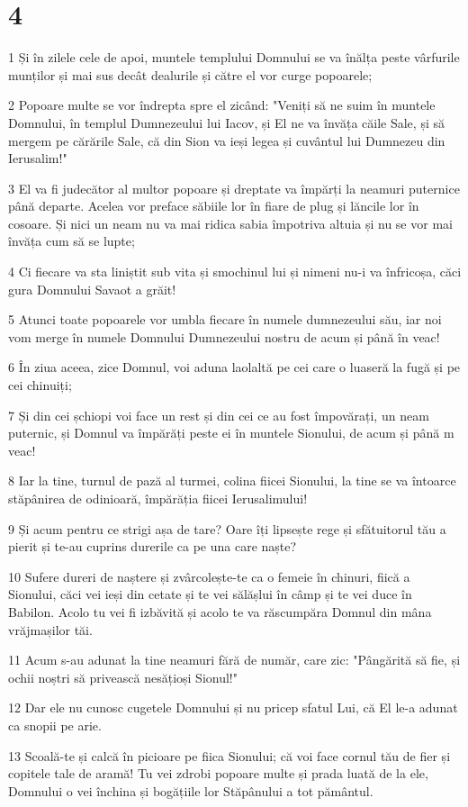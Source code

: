 \chapter{4}

\par 1 Și în zilele cele de apoi, muntele templului Domnului se va înălța peste vârfurile munților și mai sus decât dealurile și către el vor curge popoarele;
\par 2 Popoare multe se vor îndrepta spre el zicând: "Veniți să ne suim în muntele Domnului, în templul Dumnezeului lui Iacov, și El ne va învăța căile Sale, și să mergem pe cărările Sale, că din Sion va ieși legea și cuvântul lui Dumnezeu din Ierusalim!"
\par 3 El va fi judecător al multor popoare și dreptate va împărți la neamuri puternice până departe. Acelea vor preface săbiile lor în fiare de plug și lăncile lor în cosoare. Și nici un neam nu va mai ridica sabia împotriva altuia și nu se vor mai învăța cum să se lupte;
\par 4 Ci fiecare va sta liniștit sub vita și smochinul lui și nimeni nu-i va înfricoșa, căci gura Domnului Savaot a grăit!
\par 5 Atunci toate popoarele vor umbla fiecare în numele dumnezeului său, iar noi vom merge în numele Domnului Dumnezeului nostru de acum și până în veac!
\par 6 În ziua aceea, zice Domnul, voi aduna laolaltă pe cei care o luaseră la fugă și pe cei chinuiți;
\par 7 Și din cei șchiopi voi face un rest și din cei ce au fost împovărați, un neam puternic, și Domnul va împărăți peste ei în muntele Sionului, de acum și până m veac!
\par 8 Iar la tine, turnul de pază al turmei, colina fiicei Sionului, la tine se va întoarce stăpânirea de odinioară, împărăția fiicei Ierusalimului!
\par 9 Și acum pentru ce strigi așa de tare? Oare îți lipsește rege și sfătuitorul tău a pierit și te-au cuprins durerile ca pe una care naște?
\par 10 Sufere dureri de naștere și zvârcolește-te ca o femeie în chinuri, fiică a Sionului, căci vei ieși din cetate și te vei sălășlui în câmp și te vei duce în Babilon. Acolo tu vei fi izbăvită și acolo te va răscumpăra Domnul din mâna vrăjmașilor tăi.
\par 11 Acum s-au adunat la tine neamuri fără de număr, care zic: "Pângărită să fie, și ochii noștri să privească nesățioși Sionul!"
\par 12 Dar ele nu cunosc cugetele Domnului și nu pricep sfatul Lui, că El le-a adunat ca snopii pe arie.
\par 13 Scoală-te și calcă în picioare pe fiica Sionului; că voi face cornul tău de fier și copitele tale de aramă! Tu vei zdrobi popoare multe și prada luată de la ele, Domnului o vei închina și bogățiile lor Stăpânului a tot pământul.

